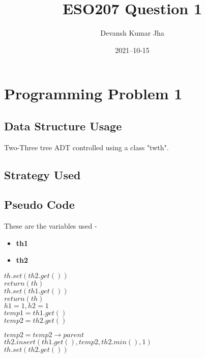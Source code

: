 \documentclass[20pt]{article}
\title{ESO207 Question 1}
\author{Devansh Kumar Jha}
\date{2021–10-15}
\begin{document}
\maketitle


\section{Programming Problem 1}

\subsection{Data Structure Usage}
Two-Three tree ADT controlled using a class "twth".

\subsection{Strategy Used}

\subsection{Pseudo Code}
These are the variables used - 
\begin{itemize}
\item \textbf{th1}
\item \textbf{th2}
\end{itemize}
\begin{algorithm}

    
     {
        $th.set(th2.get())$ \\
        $return (th)$ \\
    }
     {
        $th.set(th1.get())$ \\
        $return (th)$ \\
    }
    $h1=1,h2=1$ \\
    $temp1=th1.get()$ \\
    $temp2=th2.get()$
     {
    
     {
         {
        $temp2=temp2 \rightarrow parent$ \\
        $th2.insert(th1.get(),temp2,th2.min(),1)$ \\
        $th.set(th2.get())$
        }
    }
     }
\end{algorithm}
\end{document}
